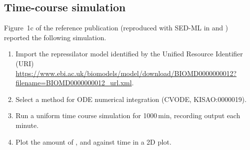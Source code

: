\subsection{Time-course simulation}
\label{sec:timecourse}
Figure~1c of the reference publication \citep{Elowitz:2000} (reproduced with SED-ML in  and ) reported the following simulation. 

\begin{enumerate}
 	\item{Import the repressilator model identified by the Unified Resource Identifier (URI) \citep{Berners-Lee:2005}\\ 	\url{https://www.ebi.ac.uk/biomodels/model/download/BIOMD0000000012?filename=BIOMD0000000012_url.xml}.}
 	\item {Select a method for ODE numerical integration (CVODE, KISAO:0000019).}
 	\item{Run a uniform time course simulation for 1000\,min, recording output each minute.}
 	\item{Plot the amount of ,  and  against time in a 2D plot.}
 \end{enumerate}

